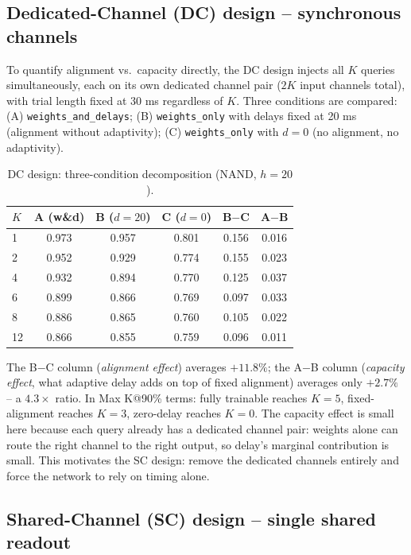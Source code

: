 \documentclass[conference]{IEEEtran}
\begin{document}
\subsection{Dedicated-Channel (DC) design -- synchronous channels}

To quantify alignment vs.\ capacity directly, the DC design injects all $K$ queries
simultaneously, each on its own dedicated channel pair ($2K$ input channels total), with
trial length fixed at 30 ms regardless of $K$. Three conditions are compared: (A)
\texttt{weights\_and\_delays}; (B) \texttt{weights\_only} with delays fixed at 20 ms
(alignment without adaptivity); (C) \texttt{weights\_only} with $d{=}0$ (no alignment, no
adaptivity).

\begin{table}[t]
\centering
\caption{DC design: three-condition decomposition (NAND, $h{=}20$).}
\label{tab:planc}
\begin{tabular}{lccccc}
\toprule
$K$ & A (w\&d) & B ($d{=}20$) & C ($d{=}0$) & B$-$C & A$-$B \\
\midrule
1 & 0.973 & 0.957 & 0.801 & 0.156 & 0.016 \\
2 & 0.952 & 0.929 & 0.774 & 0.155 & 0.023 \\
4 & 0.932 & 0.894 & 0.770 & 0.125 & 0.037 \\
6 & 0.899 & 0.866 & 0.769 & 0.097 & 0.033 \\
8 & 0.886 & 0.865 & 0.760 & 0.105 & 0.022 \\
12 & 0.866 & 0.855 & 0.759 & 0.096 & 0.011 \\
\bottomrule
\end{tabular}
\end{table}

The B$-$C column (\emph{alignment effect}) averages $+11.8\%$; the A$-$B column
(\emph{capacity effect}, what adaptive delay adds on top of fixed alignment) averages only
$+2.7\%$ -- a $4.3\times$ ratio. In Max K@90\% terms: fully trainable reaches $K{=}5$,
fixed-alignment reaches $K{=}3$, zero-delay reaches $K{=}0$. The capacity effect is small
here because each query already has a dedicated channel pair: weights alone can route
the right channel to the right output, so delay's marginal contribution is small. This
motivates the SC design: remove the dedicated channels entirely and force the network to rely on
timing alone.

\subsection{Shared-Channel (SC) design -- single shared readout}
\label{sec:pland}
\end{document}
